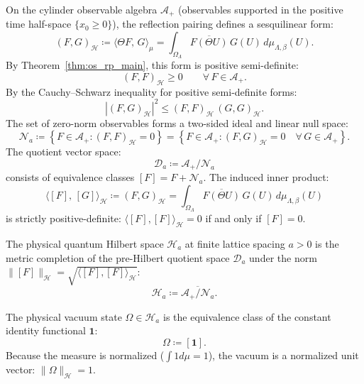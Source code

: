 On the cylinder observable algebra $\mathcal{A}_+$ (observables supported in the positive time half-space $\{x_0 \ge 0\}$), the reflection pairing defines a sesquilinear form:
\begin{equation}
(F, G)_{\mathcal{H}} \coloneqq \langle \Theta F, \, G \rangle_{\mu} = \int_{\Omega_\Lambda} \overline{F(\Theta U)} \, G(U) \, d\mu_{\Lambda, \beta}(U).
\end{equation}
By Theorem~\ref{thm:os_rp_main}, this form is positive semi-definite:
\begin{equation}
(F, F)_{\mathcal{H}} \ge 0 \qquad \forall \, F \in \mathcal{A}_+.
\end{equation}
By the Cauchy--Schwarz inequality for positive semi-definite forms:
\begin{equation}
\left| (F, G)_{\mathcal{H}} \right|^2 \le (F, F)_{\mathcal{H}} \, (G, G)_{\mathcal{H}}.
\end{equation}
The set of zero-norm observables forms a two-sided ideal and linear null space:
\begin{equation}
\label{eq:null_space_def_ch2}
\mathcal{N}_a \coloneqq \left\{ F \in \mathcal{A}_+ : (F, F)_{\mathcal{H}} = 0 \right\} = \left\{ F \in \mathcal{A}_+ : (F, G)_{\mathcal{H}} = 0 \quad \forall \, G \in \mathcal{A}_+ \right\}.
\end{equation}
The quotient vector space:
\begin{equation}
\mathcal{D}_a \coloneqq \mathcal{A}_+ / \mathcal{N}_a
\end{equation}
consists of equivalence classes $[F] = F + \mathcal{N}_a$. The induced inner product:
\begin{equation}
\label{eq:hilbert_inner_product_def}
\langle [F], \, [G] \rangle_{\mathcal{H}} \coloneqq (F, G)_{\mathcal{H}} = \int_{\Omega_\Lambda} \overline{F(\Theta U)} \, G(U) \, d\mu_{\Lambda, \beta}(U)
\end{equation}
is strictly positive-definite: $\langle [F], [F] \rangle_{\mathcal{H}} = 0$ if and only if $[F] = 0$.

\begin{definition}
The physical quantum Hilbert space $\mathcal{H}_a$ at finite lattice spacing $a > 0$ is the metric completion of the pre-Hilbert quotient space $\mathcal{D}_a$ under the norm $\|[F]\|_{\mathcal{H}} = \sqrt{\langle [F], [F] \rangle_{\mathcal{H}}}$:
\begin{equation}
\label{eq:physical_hilbert_space_def_ch2}
\mathcal{H}_a \coloneqq \overline{\mathcal{A}_+ / \mathcal{N}_a}.
\end{equation}
\end{definition}
The physical vacuum state $\Omega \in \mathcal{H}_a$ is the equivalence class of the constant identity functional $\mathbf{1}$:
\begin{equation}
\Omega \coloneqq [\mathbf{1}].
\end{equation}
Because the measure is normalized ($\int 1 d\mu = 1$), the vacuum is a normalized unit vector: $\|\Omega\|_{\mathcal{H}} = 1$.

